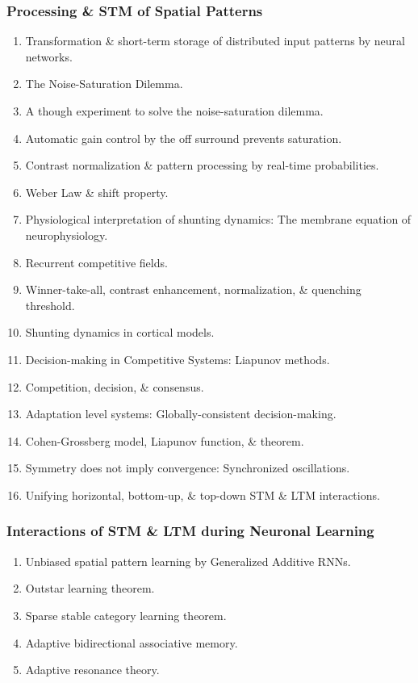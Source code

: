 \documentclass{article}
\begin{document}
\subsubsection{Processing \& STM of Spatial Patterns}

\begin{enumerate}
	\item {\sf Transformation \& short-term storage of distributed input patterns by neural networks.}
	\item {\sf The Noise-Saturation Dilemma.}
	\item {\sf A though experiment to solve the noise-saturation dilemma.}
	\item {\sf Automatic gain control by the off surround prevents saturation.}
	\item {\sf Contrast normalization \& pattern processing by real-time probabilities.}
	\item {\sf Weber Law \& shift property.}
	\item {\sf Physiological interpretation of shunting dynamics: The membrane equation of neurophysiology.}
	\item {\sf Recurrent competitive fields.}
	\item {\sf Winner-take-all, contrast enhancement, normalization, \& quenching threshold.}
	\item {\sf Shunting dynamics in cortical models.}
	\item {\sf Decision-making in Competitive Systems: Liapunov methods.}
	\item {\sf Competition, decision, \& consensus.}
	\item {\sf Adaptation level systems: Globally-consistent decision-making.}
	\item {\sf Cohen-Grossberg model, Liapunov function, \& theorem.}
	\item {\sf Symmetry does not imply convergence: Synchronized oscillations.}
	\item {\sf Unifying horizontal, bottom-up, \& top-down STM \& LTM interactions.}
\end{enumerate}

\subsubsection{Interactions of STM \& LTM during Neuronal Learning}

\begin{enumerate}
	\item {\sf Unbiased spatial pattern learning by Generalized Additive RNNs.}
	\item {\sf Outstar learning theorem.}
	\item {\sf Sparse stable category learning theorem.}
	\item {\sf Adaptive bidirectional associative memory.}
	\item {\sf Adaptive resonance theory.}
\end{enumerate}
\end{document}

